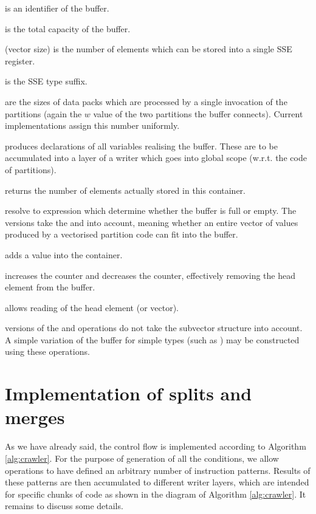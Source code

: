 \begin{description}
  \item {} is an identifier of the buffer.
  \item {} is the total capacity of the buffer.
  \item {} (vector size) is the number of elements which can be stored into a single SSE register.
  \item {} is the SSE type suffix.
  \item {} are the sizes of data packs which are processed by a single invocation of the partitions (again the $w$ value of the two partitions the buffer connects). Current implementations assign this number uniformly.
  \item {} produces declarations of all variables realising the buffer. These are to be accumulated into a layer of a writer which goes into global scope (w.r.t. the code of partitions).
  \item {} returns the number of elements actually stored in this container.
  \item {} resolve to expression which determine whether the buffer is full or empty. The  versions take the  and  into account, meaning whether an entire vector of values produced by a vectorised partition code can fit into the buffer.
  \item {} adds a value into the container.
  \item {} increases the  counter and decreases the  counter, effectively removing the head element from the buffer.
  \item {} allows reading of the head element (or vector).
  \item {} versions of the  and  operations do not take the subvector structure into account. A simple variation of the buffer for simple types (such as ) may be constructed using these operations.
\end{description}

\section{ Implementation of splits and merges }

\label{sec:splitsmerges}

As we have already said, the control flow is implemented according to Algorithm \ref{alg:crawler}. For the purpose of generation of all the conditions, we allow operations to have defined an arbitrary number of instruction patterns. Results of these patterns are then accumulated to different writer layers, which are intended for specific chunks of code as shown in the diagram of Algorithm \ref{alg:crawler}. It remains to discuss some details.

